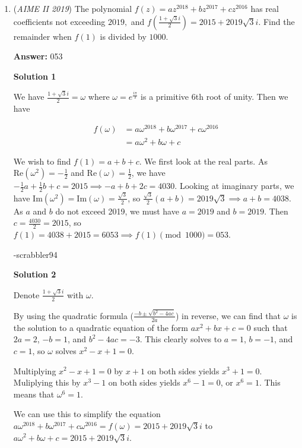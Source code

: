 \begin{enumerate}
 


	\item (\textit{AIME II 2019}) The polynomial $f(z)=az^{2018}+bz^{2017}+cz^{2016}$ has real coefficients not exceeding $2019,$ and $f\left(\frac{1+\sqrt3i}{2}\right)=2015+2019\sqrt3i$. Find the remainder when $f(1)$ is divided by $1000$.


 
 \textbf{Answer: }053



\textbf{Solution 1}

We have $\frac{1+\sqrt{3}i}{2} = \omega$ where $\omega = e^{\frac{i\pi}{3}}$ is a primitive 6th root of unity. Then we have

 
 \begin{align*} f(\omega) &= a\omega^{2018} + b\omega^{2017} + c\omega^{2016}\\ &= a\omega^2 + b\omega + c \end{align*}


 We wish to find $f(1) = a+b+c$. We first look at the real parts. As $\text{Re}(\omega^2) = -\frac{1}{2}$ and $\text{Re}(\omega) = \frac{1}{2}$, we have $-\frac{1}{2}a + \frac{1}{2}b + c = 2015 \implies -a+b + 2c = 4030$. Looking at imaginary parts, we have $\text{Im}(\omega^2) = \text{Im}(\omega) = \frac{\sqrt{3}}{2}$, so $\frac{\sqrt{3}}{2}(a+b) = 2019\sqrt{3} \implies a+b = 4038$. As $a$ and $b$ do not exceed 2019, we must have $a = 2019$ and $b = 2019$. Then $c = \frac{4030}{2} = 2015$, so $f(1) = 4038 + 2015 = 6053 \implies f(1) \pmod{1000} = \boxed{053}$.

 -scrabbler94

 



\textbf{Solution 2}

Denote $\frac{1+\sqrt{3}i}{2}$ with $\omega$.

 By using the quadratic formula ($\frac{-b\pm\sqrt{b^2-4ac}}{2a}$) in reverse, we can find that $\omega$ is the solution to a quadratic equation of the form $ax^2+bx+c=0$ such that $2a=2$, $-b=1$, and $b^2-4ac=-3$. This clearly solves to $a=1$, $b=-1$, and $c=1$, so $\omega$ solves $x^2-x+1=0$.

 Multiplying $x^2-x+1=0$ by $x+1$ on both sides yields $x^3+1=0$. Muliplying this by $x^3-1$ on both sides yields $x^6-1=0$, or $x^6=1$. This means that $\omega^6=1$.

 We can use this to simplify the equation $a\omega^{2018}+b\omega^{2017}+c\omega^{2016}=f(\omega)=2015+2019\sqrt{3}i$ to $a\omega^2+b\omega+c=2015+2019\sqrt{3}i.$


\end{enumerate}
